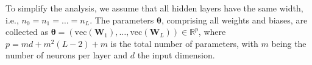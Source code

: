 To simplify the analysis, we assume that all hidden layers have the same width, i.e., \( n_0 = n_1 = \ldots = n_L \). The parameters \( \boldsymbol{\theta} \), comprising all weights and biases, are collected as \( \boldsymbol{\theta} = (\mathrm{vec}(\mathbf{W}_1), \ldots, \mathrm{vec}(\mathbf{W}_L)) \in \mathbb{R}^p \), where \( p = md + m^2(L-2) + m \) is the total number of parameters, with \( m \) being the number of neurons per layer and \( d \) the input dimension.





